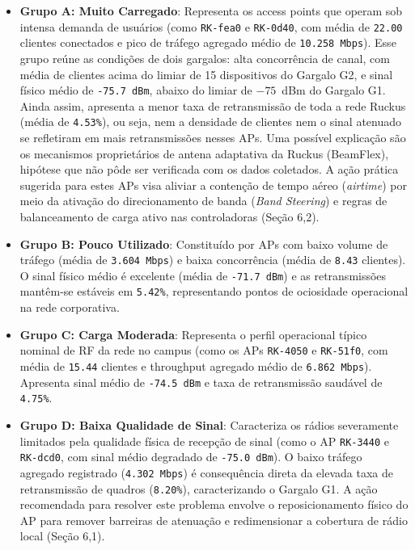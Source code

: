 \begin{itemize}
  \item \textbf{Grupo A: Muito Carregado}: Representa os access points que operam sob intensa demanda de usuários (como \texttt{RK-fea0} e \texttt{RK-0d40}, com média de \texttt{22.00} clientes conectados e pico de tráfego agregado médio de \texttt{10.258 Mbps}). Esse grupo reúne as condições de dois gargalos: alta concorrência de canal, com média de clientes acima do limiar de 15 dispositivos do Gargalo G2, e sinal físico médio de \texttt{-75.7 dBm}, abaixo do limiar de $-75$~dBm do Gargalo G1. Ainda assim, apresenta a menor taxa de retransmissão de toda a rede Ruckus (média de \texttt{4.53\%}), ou seja, nem a densidade de clientes nem o sinal atenuado se refletiram em mais retransmissões nesses APs. Uma possível explicação são os mecanismos proprietários de antena adaptativa da Ruckus (BeamFlex), hipótese que não pôde ser verificada com os dados coletados. A ação prática sugerida para estes APs visa aliviar a contenção de tempo aéreo (\textit{airtime}) por meio da ativação do direcionamento de banda (\textit{Band Steering}) e regras de balanceamento de carga ativo nas controladoras (Seção 6,2).
  \item \textbf{Grupo B: Pouco Utilizado}: Constituído por APs com baixo volume de tráfego (média de \texttt{3.604 Mbps}) e baixa concorrência (média de \texttt{8.43} clientes). O sinal físico médio é excelente (média de \texttt{-71.7 dBm}) e as retransmissões mantêm-se estáveis em \texttt{5.42\%}, representando pontos de ociosidade operacional na rede corporativa.
  \item \textbf{Grupo C: Carga Moderada}: Representa o perfil operacional típico nominal de RF da rede no campus (como os APs \texttt{RK-4050} e \texttt{RK-51f0}, com média de \texttt{15.44} clientes e throughput agregado médio de \texttt{6.862 Mbps}). Apresenta sinal médio de \texttt{-74.5 dBm} e taxa de retransmissão saudável de \texttt{4.75\%}.
  \item \textbf{Grupo D: Baixa Qualidade de Sinal}: Caracteriza os rádios severamente limitados pela qualidade física de recepção de sinal (como o AP \texttt{RK-3440} e \texttt{RK-dcd0}, com sinal médio degradado de \texttt{-75.0 dBm}). O baixo tráfego agregado registrado (\texttt{4.302 Mbps}) é consequência direta da elevada taxa de retransmissão de quadros (\texttt{8.20\%}), caracterizando o Gargalo G1. A ação recomendada para resolver este problema envolve o reposicionamento físico do AP para remover barreiras de atenuação e redimensionar a cobertura de rádio local (Seção 6,1).

\end{itemize}
